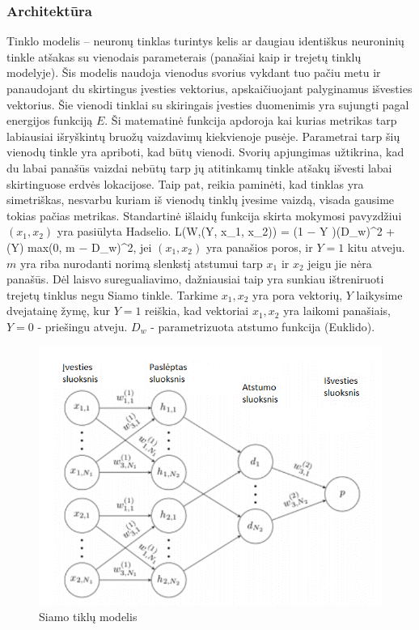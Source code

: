 \documentclass{VUMIFPSkursinis}
\let\[\relax \let\]\relax %
\DeclareRobustCommand{\[}{\begin{equation}}
\DeclareRobustCommand{\]}{\end{equation}}
\begin{document}
\subsubsection{Architektūra}
Tinklo modelis – neuronų tinklas turintys kelis ar daugiau identiškus neuroninių tinkle atšakas su vienodais parameterais \cite{Siamese_Network} (panašiai kaip ir trejetų tinklų modelyje). Šis modelis naudoja vienodus svorius vykdant tuo pačiu metu ir panaudojant du skirtingus įvesties vektorius, apskaičiuojant palyginamus išvesties vektorius. Šie vienodi tinklai su skiringais įvesties duomenimis yra sujungti pagal energijos funkciją $E$. Ši matematinė funkcija apdoroja kai kurias metrikas tarp labiausiai išryškintų bruožų vaizdavimų kiekvienoje pusėje.
Parametrai tarp šių vienodų tinkle yra apriboti, kad būtų vienodi. Svorių apjungimas užtikrina, kad du labai panašūs vaizdai nebūtų tarp jų atitinkamų tinkle  atšakų išvesti labai skirtinguose erdvės lokacijose. Taip pat, reikia paminėti, kad tinklas yra simetriškas, nesvarbu kuriam iš vienodų tinklų įvesime vaizdą, visada gausime tokias pačias metrikas.
Standartinė išlaidų funkcija skirta mokymosi pavyzdžiui $(x_1, x_2)$ yra pasiūlyta Hadselio. 
\[L(W,(Y, x_1, x_2)) =  (1 − Y )(D_w)^2 + (Y)  {max(0, m − D_w)}^2\], jei $(x_1, x_2)$  yra panašios poros, ir $Y = 1$ kitu atveju. $m$ yra riba nurodanti norimą slenkstį atstumui tarp $x_1$ ir $x_2$ jeigu jie nėra panašūs. Dėl laisvo suregualiavimo, dažniausiai taip yra sunkiau ištreniruoti trejetų tinklus negu Siamo tinkle. Tarkime $x_1, x_2$ yra pora vektorių, $Y$ laikysime dvejatainę žymę, kur $Y = 1$ reiškia, kad vektoriai $x_1, x_2$ yra laikomi panašiais, $Y = 0$ - priešingu atveju. $D_w$ - parametrizuota atstumo funkcija (Euklido).

\begin{figure}[H]
\centering
\includegraphics[scale=1.0]{img/Siamese}
\caption{Siamo tiklų modelis} %
\label{img:mlp}
\end{figure}
\end{document}
